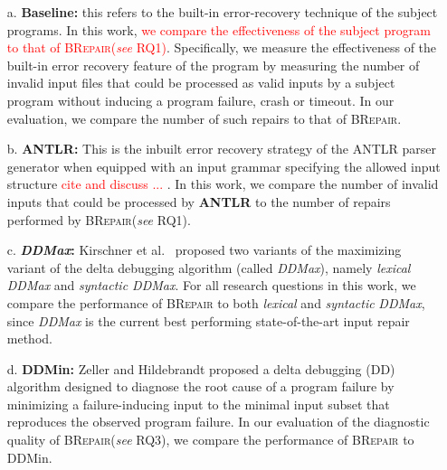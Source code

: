 \documentclass[sigconf,review,anonymous]{acmart}
\newcounter{todocounter}
\newcommand{\todo}[1]{\marginpar{$|$}\textcolor{red}{\stepcounter{todocounter}\footnote[\thetodocounter]{\textcolor{red}{\textbf{TODO }}\textit{#1}}}}
\newcommand{\recheck}[1]{\textcolor{red}{#1}}
\renewcommand{\todo}[1]{}
\newcommand{\ddmin}{\textit{ddmin}\xspace}
\newcommand{\approach}{\textsc{BRepair}\xspace}
\def\ddmin{DDMin\xspace}
\newcommand{\ddmax}{\textit{DDMax}\xspace}
\begin{document}
\begin{enumerate}[wide, labelwidth=!, labelindent=0pt]
\item[a.] \textbf{Baseline:} this refers to  the built-in error-recovery technique of the subject programs. In this work,  \recheck{we compare the effectiveness of the subject program to that of \approach (\textit{see} RQ1)}. Specifically, we measure the effectiveness of the built-in error recovery feature of the program by measuring the number of invalid input files that could be processed as valid inputs by a subject program without inducing a program failure, crash or timeout. In our evaluation, we compare the number of such repairs to that of \approach.

\item[b.] \textbf{ANTLR:} This is the inbuilt error recovery strategy of the ANTLR parser generator when equipped with an input grammar specifying the allowed input structure \recheck{cite and discuss ... }. In this work, we compare the number of invalid inputs that could be processed by \textbf{ANTLR} to the number of repairs performed by \approach (\textit{see} RQ1).

\item[c.] \textbf{\ddmax:} Kirschner et al.~\cite{kirschner2020debugging} proposed %
two variants of the maximizing variant of the delta debugging algorithm (called \ddmax), %
namely \textit{lexical \ddmax} and \textit{syntactic \ddmax}. For all research questions in this work, we compare the performance of \approach to both \textit{lexical} and \textit{syntactic} \ddmax, since \ddmax is the current best performing state-of-the-art input repair method.


\item[d.] \textbf{\ddmin:} Zeller and Hildebrandt proposed
a delta debugging (DD) algorithm designed to diagnose the root cause of a program failure %
by %
minimizing a failure-inducing input to the minimal input subset that reproduces
the observed program failure. In our evaluation of the diagnostic quality of \approach (\textit{see} RQ3), we compare the performance of \approach to \ddmin.

\end{enumerate}

%
%
%
%
\end{document}
